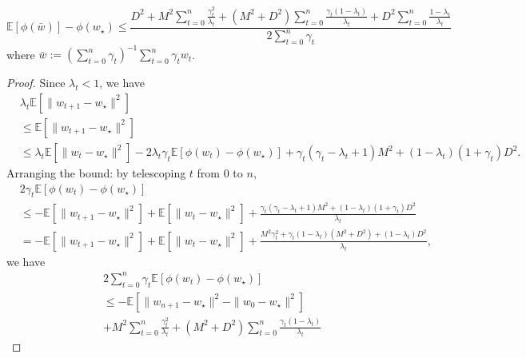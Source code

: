 \begin{theorem}
	\begin{equation}
		\mathbb{E}\left[\phi(\bar{w}) \right]-\phi(w_\star) \leq
		\frac{D^2+M^2\sum_{t=0}^{n}\frac{\gamma_t^2}{\lambda_t}
			+(M^2+D^2)\sum_{t=0}^{n}\frac{\gamma_t(1-\lambda_t)}{\lambda_t}
			+D^2\sum_{t=0}^{n}\frac{1-\lambda_t}{\lambda_t}}{2\sum_{t=0}^{n}\gamma_t}
	\end{equation}
	where $\bar{w}:=(\sum_{t=0}^{n}\gamma_t)^{-1} \sum_{t=0}^{n}\gamma_t w_t$.
\end{theorem}
\begin{proof}
	Since $\lambda_t<1$, we have
	\begin{equation}
		\begin{split}
			&\lambda_t \mathbb{E}\left[ \|w_{t+1}-w_\star \|^2 \right]\\
			&\leq \mathbb{E}\left[ \|w_{t+1}-w_\star \|^2 \right]\\
			&\leq
			\lambda_t\mathbb{E}\left[ \|w_t-w_\star\|^2 \right]
			-2\lambda_t\gamma_t\mathbb{E}\left[ \phi(w_t)-\phi(w_\star) \right]
			+\gamma_t(\gamma_t - \lambda_t+1) M^2 + (1-\lambda_t)(1+\gamma_t) D^2.
		\end{split}
	\end{equation}
	Arranging the bound: by telescoping $t$ from $0$ to $n$,
	\begin{equation}\label{ineq2}
		\begin{split}
			&2\gamma_t\mathbb{E}\left[ \phi(w_t)-\phi(w_\star) \right]\\
			&\leq -\mathbb{E}\left[ \|w_{t+1}-w_\star \|^2 \right]
			+\mathbb{E}\left[ \|w_t-w_\star\|^2 \right]
			+\frac{
				\gamma_t(\gamma_t-\lambda_t+1) M^2 + (1-\lambda_t)(1+\gamma_t) D^2
			}{\lambda_t}\\
			&=-\mathbb{E}\left[ \|w_{t+1}-w_\star \|^2 \right]
			+\mathbb{E}\left[ \|w_t-w_\star\|^2 \right]
			+\frac{M^2\gamma_t^2+\gamma_t(1-\lambda_t)\left( M^2+D^2 \right)+(1-\lambda_t)D^2}{\lambda_t},
		\end{split}
	\end{equation}
	we have
	\begin{equation}
		\begin{split}
			&2\sum_{t=0}^{n} \gamma_t \mathbb{E}\left[ \phi(w_t)-\phi(w_\star) \right]\\
			&\leq
			-\mathbb{E}\left[ \|w_{n+1}-w_\star\|^2-\|w_0-w_\star\|^2 \right]\\
			&+M^2\sum_{t=0}^{n}\frac{\gamma_t^2}{\lambda_t}
			+(M^2+D^2)\sum_{t=0}^{n}\frac{\gamma_t(1-\lambda_t)}{\lambda_t}

\end{split}
\end{equation}
\end{proof}
